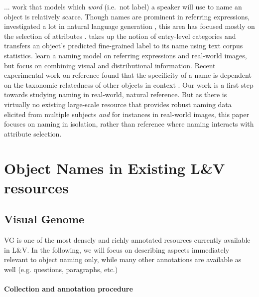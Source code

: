 \documentclass[10pt, a4paper]{article}
\newcommand{\vg}{VG\xspace}
\begin{document}
... work that models which \textit{word} (i.e.\ not label) a speaker will use to name an object is relatively scarce.
Though names are prominent in referring expressions, investigated a lot in natural language generation \cite{dale:1995}, this area has focused mostly on the selection of attributes %
\cite{krahmer:2012}. 
 takes up the notion of entry-level categories \cite{rosch1976basic} and transfers an object's predicted fine-grained label to its name using text corpus statistics.
  learn a naming model on referring expressions and real-world images, but focus on combining visual and distributional information. 
 Recent experimental work on reference found that the specificity of a name is dependent on the taxonomic relatedness of other objects in context
\cite{rohde2012communicating,graf2016animal}. Our work is a first step towards studying naming in real-world, natural reference.
But as there is virtually no existing large-scale resource that provides robust naming data elicited from multiple subjects \textit{and} for instances in real-world images, this paper focuses on naming in isolation, rather than reference where naming interacts with attribute selection.




\section{Object Names in Existing L\&V resources}


\subsection{Visual Genome}

\vg \cite{krishna2016visualgenome} is one of the most densely and richly annotated resources currently available in L\&V. In the following, we will focus on describing aspects immediately relevant to object naming only, while many other annotations are available as well (e.g. questions, paragraphs, etc.)

\paragraph{Collection and annotation procedure}
\end{document}
